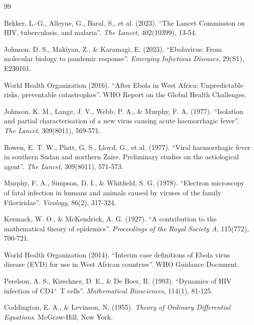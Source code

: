 ﻿\documentclass[a4paper,12pt]{article}
\theoremstyle{definition}
\begin{document}

\begin{thebibliography}{99}

Bekker, L.-G., Alleyne, G., Baral, S., et al. (2023).
``The Lancet Commission on HIV, tuberculosis, and malaria''.
\textit{The Lancet}, 402(10399), 13-54.

Johnson, D. S., Makiyan, Z., \& Karamagi, E. (2023).
``Ebolavirus: From molecular biology to pandemic response''.
\textit{Emerging Infectious Diseases}, 29(S1), E230101.

World Health Organization (2016).
``After Ebola in West Africa: Unpredictable risks, preventable catastrophes''.
WHO Report on the Global Health Challenges.

Johnson, K. M., Lange, J. V., Webb, P. A., \& Murphy, F. A. (1977).
``Isolation and partial characterisation of a new virus causing acute haemorrhagic fever''.
\textit{The Lancet}, 309(8011), 569-571.

Bowen, E. T. W., Platt, G. S., Lloyd, G., et al. (1977).
``Viral haemorrhagic fever in southern Sudan and northern Zaire. Preliminary studies on the aetiological agent''.
\textit{The Lancet}, 309(8011), 571-573.

Murphy, F. A., Simpson, D. I., \& Whitfield, S. G. (1978).
``Electron microscopy of fatal infection in humans and animals caused by viruses of the family Filoviridae''.
\textit{Virology}, 86(2), 317-324.

Kermack, W. O., \& McKendrick, A. G. (1927).
``A contribution to the mathematical theory of epidemics''.
\textit{Proceedings of the Royal Society A}, 115(772), 700-721.

World Health Organization (2014).
``Interim case definitions of Ebola virus disease (EVD) for use in West African countries''.
WHO Guidance Document.

Perelson, A. S., Kirschner, D. E., \& De Boer, R. (1993).
``Dynamics of HIV infection of CD4$^+$ T cells''.
\textit{Mathematical Biosciences}, 114(1), 81-125.

Coddington, E. A., \& Levinson, N. (1955).
\textit{Theory of Ordinary Differential Equations}.
McGraw-Hill, New York.


\end{thebibliography}
\end{document}

